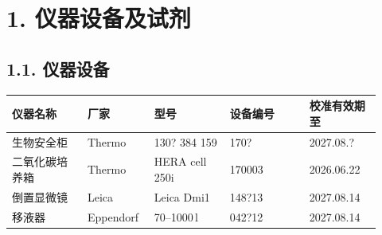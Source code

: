 \documentclass[UTF8,10pt,a4paper,fontset=fandol]{ctexart}
\newcommand{\fieldvalue}[1]{#1}
\newcommand{\handwritten}[1]{#1}
\begin{document}
\section*{1. 仪器设备及试剂}

\subsection*{1.1. 仪器设备}

\begin{center}
\small
\begin{tabular}{|p{0.19\linewidth}|p{0.16\linewidth}|p{0.19\linewidth}|p{0.20\linewidth}|p{0.18\linewidth}|}
\hline
仪器名称 & 厂家 & 型号 & 设备编号 & 校准有效期至 \\
\hline
生物安全柜 & Thermo &
\fieldvalue{\handwritten{130? 384 159}} &
\fieldvalue{\handwritten{170?}} &
\fieldvalue{\handwritten{2027.08.?}} \\
\hline
二氧化碳培养箱 & Thermo &
\fieldvalue{HERA cell 250i} &
\fieldvalue{\handwritten{170003}} &
\fieldvalue{2026.06.22} \\
\hline
倒置显微镜 & Leica &
\fieldvalue{Leica Dmi1} &
\fieldvalue{\handwritten{148?13}} &
\fieldvalue{\handwritten{2027.08.14}} \\
\hline
移液器 & Eppendorf &
\fieldvalue{\handwritten{70--1000\,\textmu l}} &
\fieldvalue{\handwritten{042?12}} &
\fieldvalue{\handwritten{2027.08.14}} \\
\hline
\end{tabular}
\end{center}
\end{document}
